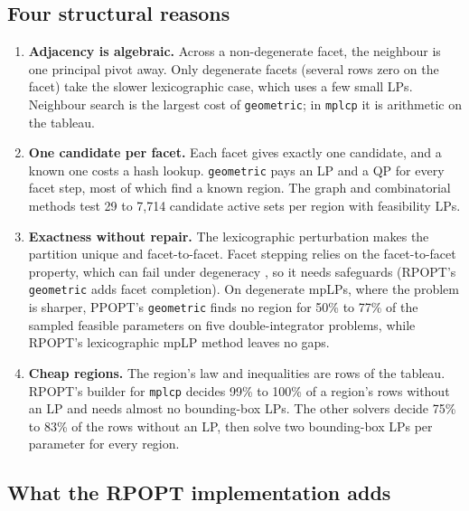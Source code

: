 \documentclass[11pt]{article}
\newcommand{\code}[1]{\texttt{#1}}
\let\oldsubsection\subsection
\renewcommand{\subsection}{\Needspace{7\baselineskip}\oldsubsection}
\begin{document}
\subsection{Four structural reasons}

\begin{enumerate}
  \item \textbf{Adjacency is algebraic.} Across a non-degenerate facet, the neighbour is one principal pivot away.
  Only degenerate facets (several rows zero on the facet) take the slower lexicographic case, which uses a few small
  LPs. Neighbour search is the largest cost of \code{geometric}; in \code{mplcp} it is arithmetic on the tableau.
  \item \textbf{One candidate per facet.} Each facet gives exactly one candidate, and a known one costs a hash
  lookup. \code{geometric} pays an LP and a QP for every facet step, most of which find a known region. The graph
  and combinatorial methods test 29 to 7,714 candidate active sets per region with feasibility LPs.
  \item \textbf{Exactness without repair.} The lexicographic perturbation makes the partition unique and
  facet-to-facet. Facet stepping relies on the facet-to-facet property, which can fail under degeneracy
  \cite{spjotvold2006}, so it needs safeguards (RPOPT's \code{geometric} adds facet completion). On degenerate mpLPs,
  where the problem is sharper, PPOPT's \code{geometric} finds no region for 50\% to 77\% of the sampled feasible
  parameters on five double-integrator problems, while RPOPT's lexicographic mpLP method leaves no gaps.
  \item \textbf{Cheap regions.} The region's law and inequalities are rows of the tableau. RPOPT's builder for
  \code{mplcp} decides 99\% to 100\% of a region's rows without an LP and needs almost no bounding-box LPs. The
  other solvers decide 75\% to 83\% of the rows without an LP, then solve two bounding-box LPs per parameter for
  every region.
\end{enumerate}

\subsection{What the RPOPT implementation adds}
\end{document}
